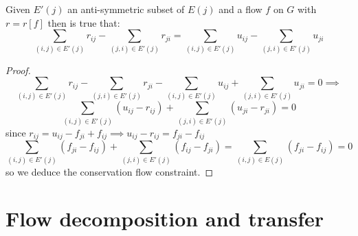 \begin{lemma}

    Given $E'(j)$ an anti-symmetric subset of $E(j)$ and a flow $f$ on $G$ with $r = r[f]$ then is true that:
    \[\sum_{(i,j)\in E'(j)}r_{ij} - \sum_{(j,i)\in E'(j)}r_{ji} = \sum_{(i,j)\in E'(j)}u_{ij} - \sum_{(j,i)\in E'(j)}u_{ji} \]
\end{lemma}
\begin{proof}
    \[\sum_{(i,j)\in E'(j)}r_{ij} - \sum_{(j,i)\in E'(j)}r_{ji} -\sum_{(i,j)\in E'(j)}u_{ij} + \sum_{(j,i)\in E'(j)}u_{ji}= 0 \implies\]
    \[\sum_{(i,j)\in E'(j)}(u_{ij}-r_{ij}) + \sum_{(j,i)\in E'(j)}(u_{ji}-r_{ji}) = 0 \]
    since $r_{ij} = u_{ij} - f_{ji} + f_{ij} \implies u_{ij} -r_{ij} = f_{ji}- f_{ij}$ 
    \[\sum_{(i,j)\in E'(j)}(f_{ji}-f_{ij}) + \sum_{(j,i)\in E'(j)}(f_{ij}-f_{ji}) = \sum_{(i,j)\in E(j)}(f_{ji}-f_{ij}) = 0\]
    so we deduce the conservation flow constraint. 

\end{proof}
\section{Flow decomposition and transfer}


